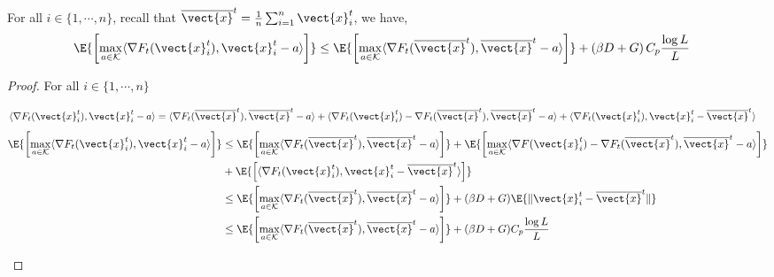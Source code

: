 \begin{lemma}
\label{lemma:final_step}
For all $i \in \{1, \cdots, n \}$, recall that $\overline{\vect{x}}^t = \frac{1}{n}\sum_{i=1}^n \vect{x}^t_{i}$, we have,
\begin{align*}
    \E{\left[\max_{a \in \mathcal{K}}\langle \nabla F_t (\vect{x}^t_{i}), \vect{x}^t_i - a \rangle \right]}
    & \leq \E{\left[\max_{a \in \mathcal{K}}\langle \nabla F_t (\overline{\vect{x}}^t), \overline{\vect{x}}^t - a \rangle \right]} + \left(\beta D + G \right)C_p \frac{\log L}{L}
\end{align*}
\end{lemma}

\begin{proof} For all $i \in \{1, \cdots, n\}$
\begin{linenomath}
\begin{align*}
    \langle \nabla F_t (\vect{x}^t_i), \vect{x}^t_i - a \rangle 
    & = \langle \nabla F_t (\overline{\vect{x}}^t), \overline{\vect{x}}^t - a \rangle + \langle \nabla F_t (\vect{x}^t_i) - \nabla F_t (\overline{\vect{x}}^t), \overline{\vect{x}}^t - a\rangle + \langle \nabla F_t (\vect{x}^t_i), \vect{x}^t_i - \overline{\vect{x}}^t \rangle
\end{align*}
\begin{align*}
    \E{\left[\max_{a \in \mathcal{K}}\langle \nabla F_t (\vect{x}^t_{i}), \vect{x}^t_i - a \rangle \right]}
    & \leq \E{\left[\max_{a \in \mathcal{K}}\langle \nabla F_t (\overline{\vect{x}}^t), \overline{\vect{x}}^t - a \rangle \right]} + \E{\left[\max_{a \in \mathcal{K}} \langle \nabla F (\vect{x}^t_i) - \nabla F_t (\overline{\vect{x}}^t), \overline{\vect{x}}^t - a \rangle \right]} \\
    & + \E{\left[\langle \nabla F_t (\vect{x}^t_i), \vect{x}^t_i - \overline{\vect{x}}^t \rangle\right]}\\
    & \leq \E{\left[\max_{a \in \mathcal{K}}\langle \nabla F_t (\overline{\vect{x}}^t), \overline{\vect{x}}^t - a \rangle \right]} + (\beta D + G) \E{\|\vect{x}^t_i - \overline{\vect{x}}^t\|} \\
    & \leq \E{\left[\max_{a \in \mathcal{K}}\langle \nabla F_t (\overline{\vect{x}}^t), \overline{\vect{x}}^t - a \rangle \right]} + (\beta D + G)C_p \frac{\log L}{L}
\end{align*}
\end{linenomath}
\end{proof}

